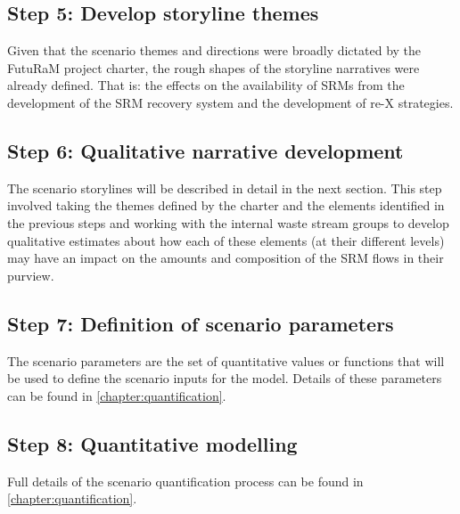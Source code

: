 \subsection{Step 5: Develop storyline themes}

Given that the scenario themes and directions were broadly dictated by the FutuRaM project charter, the rough shapes of the storyline narratives were already defined. That is: the effects on the availability of SRMs from the development of the SRM recovery system and the development of re-X strategies.

\vspace{\baselineskip} 

\subsection{Step 6: Qualitative narrative development}

The scenario storylines will be described in detail in the next section. This step involved taking the themes defined by the charter and the elements identified in the previous steps and working with the internal waste stream groups to develop qualitative estimates about how each of these elements (at their different levels) may have an impact on the amounts and composition of the SRM flows in their purview.

\vspace{\baselineskip} 

\subsection{Step 7: Definition of scenario parameters}

The scenario parameters are the set of quantitative values or functions that will be used to define the scenario inputs for the model. Details of these parameters can be found in \autoref{chapter:quantification}.

\vspace{\baselineskip} 

\subsection{Step 8: Quantitative modelling}

Full details of the scenario quantification process can be found in \autoref{chapter:quantification}.

\vspace{\baselineskip} 


